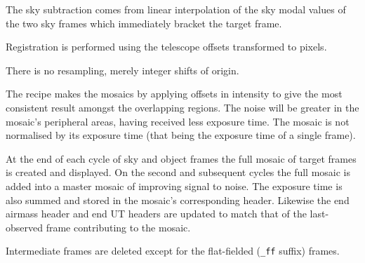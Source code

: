 \documentclass[twoside,11pt,nolof]{starlink}
\begin{document}
{{{         \sstitem
         The sky subtraction comes from linear interpolation of the sky
         modal values of the two sky frames which immediately bracket the
         target frame.

         \sstitem
         Registration is performed using the telescope offsets
         transformed to pixels.

         \sstitem
         There is no resampling, merely integer shifts of origin.

         \sstitem
         The recipe makes the mosaics by applying offsets in intensity
         to give the most consistent result amongst the overlapping regions.
         The noise will be greater in the mosaic's peripheral areas, having
         received less exposure time.  The mosaic is not normalised by its
         exposure time (that being the exposure time of a single frame).

         \sstitem
         At the end of each cycle of sky and object frames the full
         mosaic of target frames is created and displayed.  On the second and
         subsequent cycles the full mosaic is added into a master mosaic of
         improving signal to noise.  The exposure time is also summed and
         stored in the mosaic's corresponding header.  Likewise the end
         airmass header and end UT headers are updated to match that of
         the last-observed frame contributing to the mosaic.

         \sstitem
         Intermediate frames are deleted except for the flat-fielded ({\tt\_ff}
         suffix) frames.
      }
   }
   }
\end{document}
